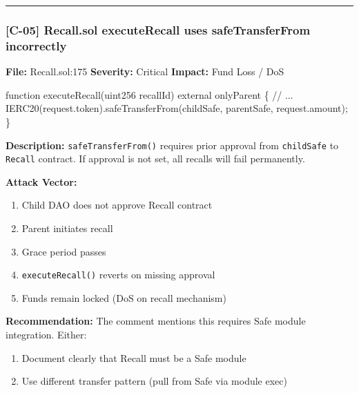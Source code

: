 \documentclass[
]{article}
\newenvironment{Shaded}{}{}
\newcommand{\NormalTok}[1]{#1}
\providecommand{\tightlist}{%
  \setlength{\itemsep}{0pt}\setlength{\parskip}{0pt}}
\begin{document}
\begin{center}\rule{0.5\linewidth}{0.5pt}\end{center}

\subsubsection{{[}C-05{]} Recall.sol executeRecall uses safeTransferFrom
incorrectly}\label{c-05-recallsol-executerecall-uses-safetransferfrom-incorrectly}

\textbf{File:} Recall.sol:175 \textbf{Severity:} Critical
\textbf{Impact:} Fund Loss / DoS

\begin{Shaded}
\begin{Highlighting}[]
\NormalTok{function executeRecall(uint256 recallId) external onlyParent \{}
\NormalTok{    // ...}
\NormalTok{    IERC20(request.token).safeTransferFrom(childSafe, parentSafe, request.amount);}
\NormalTok{\}}
\end{Highlighting}
\end{Shaded}

\textbf{Description:} \texttt{safeTransferFrom()} requires prior
approval from \texttt{childSafe} to \texttt{Recall} contract. If
approval is not set, all recalls will fail permanently.

\textbf{Attack Vector:}

\begin{enumerate}
\def\labelenumi{\arabic{enumi}.}
\tightlist
\item
  Child DAO does not approve Recall contract
\item
  Parent initiates recall
\item
  Grace period passes
\item
  \texttt{executeRecall()} reverts on missing approval
\item
  Funds remain locked (DoS on recall mechanism)
\end{enumerate}

\textbf{Recommendation:} The comment mentions this requires Safe module
integration. Either:

\begin{enumerate}
\def\labelenumi{\arabic{enumi}.}
\tightlist
\item
  Document clearly that Recall must be a Safe module
\item
  Use different transfer pattern (pull from Safe via module exec)
\end{enumerate}
\end{document}
